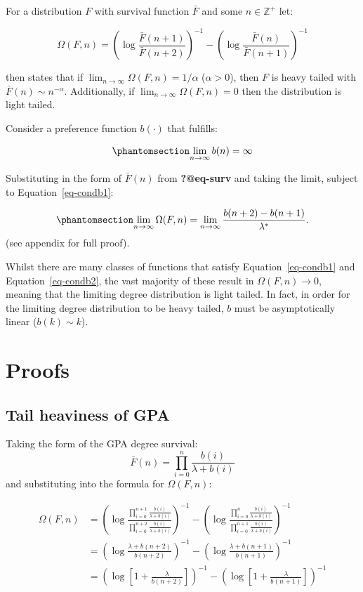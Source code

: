 \documentclass[
  sn-basic,
]{sn-jnl}
\theoremstyle{plain}
\theoremstyle{remark}
\begin{document}
For a distribution \(F\) with survival function \(\bar F\) and some
\(n\in\mathbb Z^+\) let:

\[
\Omega(F,n) = \left(\log\displaystyle\frac{\bar F (n+1)}{\bar F (n+2)}\right)^{-1} - \left(\log\displaystyle\frac{\bar F (n)}{\bar F (n+1)}\right)^{-1}
\]

\citep{shimura12} then states that if
\(\lim_{n\rightarrow\infty} \Omega(F,n) = 1/\alpha\) (\(\alpha>0\)),
then \(F\) is heavy tailed with \(\bar F(n) \sim n^{-\alpha}\).
Additionally, if \(\lim_{n\rightarrow\infty} \Omega(F,n) = 0\) then the
distribution is light tailed.

Consider a preference function \(b(\cdot)\) that fulfills:

\begin{equation}\phantomsection\label{eq-condb1}{
\lim_{n\rightarrow \infty} b(n) = \infty
}\end{equation}

Substituting in the form of \(\bar F(n)\) from \textbf{?@eq-surv} and
taking the limit, subject to Equation~\ref{eq-condb1}:

\begin{equation}\phantomsection\label{eq-omegares}{
\lim_{n\rightarrow\infty}\Omega(F,n) = \lim_{n\rightarrow\infty}\frac{b(n+2)-b(n+1)}{\lambda^*}.
}\end{equation} (see appendix for full proof).

Whilst there are many classes of functions that satisfy
Equation~\ref{eq-condb1} and Equation~\ref{eq-condb2}, the vast majority
of these result in \(\Omega(F,n) \rightarrow 0\), meaning that the
limiting degree distribution is light tailed. In fact, in order for the
limiting degree distribution to be heavy tailed, \(b\) must be
asymptotically linear (\(b(k)\sim k\)).

\section{Proofs}\label{proofs}

\subsection{Tail heaviness of GPA}\label{tail-heaviness-of-gpa}

Taking the form of the GPA degree survival: \[
\bar F(n) = \prod_{i=0}^n\frac{b(i)}{\lambda+b(i)}
\] and substituting into the formula for \(\Omega(F,n)\):

\begin{align*}
\Omega(F,n)&=\left(\log\frac{\prod_{i=0}^{n+1}\frac{b(i)}{\lambda+b(i)}}{\prod_{i=0}^{n+2}\frac{b(i)}{\lambda+b(i)}}\right)^{-1}-\left(\log\frac{\prod_{i=0}^{n}\frac{b(i)}{\lambda+b(i)}}{\prod_{i=0}^{n+1}\frac{b(i)}{\lambda+b(i)}}\right)^{-1}\\
&=\left(\log\frac{\lambda+b(n+2)}{b(n+2)}\right)^{-1}-\left(\log\frac{\lambda+b(n+1)}{b(n+1)}\right)^{-1}\\
&=\left(\log\left[1+\frac{\lambda}{b(n+2)}\right]\right)^{-1}-\left(\log\left[1+\frac{\lambda}{b(n+1)}\right]\right)^{-1}
\end{align*}
\end{document}
